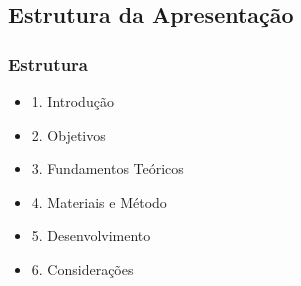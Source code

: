 \subsection{Estrutura da Apresentação}
\begin{frame}
	\frametitle{Estrutura}
	
	\begin{itemize}
	  \item 1. Introdução
	  \item 2. Objetivos
	  \item 3. Fundamentos Teóricos
	  \item 4. Materiais e Método
	  \item 5. Desenvolvimento
	  \item 6. Considerações
	\end{itemize}
\end{frame}